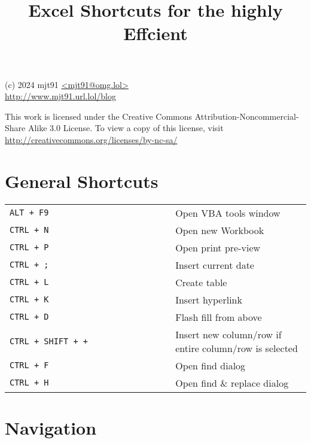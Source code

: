 \documentclass[8pt]{extarticle} %
\begin{document}
\raggedright

\begin{multicols}{2}

\title{Excel Shortcuts for the highly Effcient}

{\small
(c) 2024 mjt91 \url{<mjt91@omg.lol>}\\
\url{http://www.mjt91.url.lol/blog}

This work is licensed under the Creative Commons Attribution-Noncommercial-Share
Alike 3.0 License. To view a copy of this license, visit
\url{http://creativecommons.org/licenses/by-nc-sa/}
}

\vspace*{1pt}

\section{General Shortcuts}

  \vspace{1ex}
  \begin{tabular}{L{0.55\linewidth} L{0.45\linewidth}}

    \tt ALT + F9                & Open VBA tools window \\
    \tt CTRL + N                & Open new Workbook \\
    \tt CTRL + P                & Open print pre-view \\
    \tt CTRL + ;                & Insert current date \\
    \tt CTRL + L                & Create table \\
    \tt CTRL + K                & Insert hyperlink \\
    \tt CTRL + D                & Flash fill from above \\
    \tt CTRL + SHIFT + +        & Insert new column/row if entire column/row is selected \\
    \tt CTRL + F                & Open find dialog \\
    \tt CTRL + H                & Open find \& replace dialog \\

  \end{tabular}
  
\section{Navigation}


\end{multicols}
\end{document}
